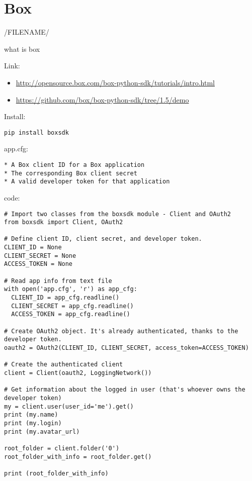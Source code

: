 \section{Box}\label{box}

/FILENAME/

what is box

Link:

\begin{itemize}

\item
  \url{http://opensource.box.com/box-python-sdk/tutorials/intro.html}
\item
  \url{https://github.com/box/box-python-sdk/tree/1.5/demo}
\end{itemize}

Install:

\begin{verbatim}
pip install boxsdk
\end{verbatim}

app.cfg:

\begin{verbatim}
* A Box client ID for a Box application
* The corresponding Box client secret
* A valid developer token for that application
\end{verbatim}

code:

\begin{verbatim}
# Import two classes from the boxsdk module - Client and OAuth2
from boxsdk import Client, OAuth2

# Define client ID, client secret, and developer token.
CLIENT_ID = None
CLIENT_SECRET = None
ACCESS_TOKEN = None

# Read app info from text file
with open('app.cfg', 'r') as app_cfg:
  CLIENT_ID = app_cfg.readline()
  CLIENT_SECRET = app_cfg.readline()
  ACCESS_TOKEN = app_cfg.readline()

# Create OAuth2 object. It's already authenticated, thanks to the developer token.
oauth2 = OAuth2(CLIENT_ID, CLIENT_SECRET, access_token=ACCESS_TOKEN)

# Create the authenticated client
client = Client(oauth2, LoggingNetwork())

# Get information about the logged in user (that's whoever owns the developer token)
my = client.user(user_id='me').get()
print (my.name)
print (my.login)
print (my.avatar_url)

root_folder = client.folder('0')
root_folder_with_info = root_folder.get()

print (root_folder_with_info)
\end{verbatim}

